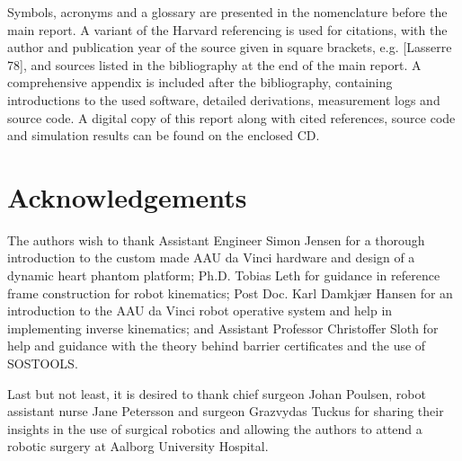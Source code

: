 Symbols, acronyms and a glossary are presented in the nomenclature before the main report.
A variant of the Harvard referencing is used for citations, with the author and publication year of the source given in square brackets, e.g. [Lasserre 78], and sources listed in the bibliography at the end of the main report. %
A comprehensive appendix is included after the bibliography, containing introductions to the used software, detailed derivations, measurement logs and source code.
A digital copy of this report along with cited references, source code and simulation results can be found on the enclosed CD.

\vspace*{-2mm}
\section*{Acknowledgements}
\vspace*{-2mm}
The authors wish to thank Assistant Engineer Simon Jensen for a thorough introduction to the custom made AAU da Vinci hardware and design of a dynamic heart phantom platform; Ph.D. Tobias Leth for guidance in reference frame construction for robot kinematics;  Post Doc. Karl Damkj\ae r Hansen for an introduction to the AAU da Vinci robot operative system and help in implementing inverse kinematics; and Assistant Professor Christoffer Sloth for help and guidance with the theory behind barrier certificates and the use of SOSTOOLS.

Last but not least, it is desired to thank chief surgeon Johan Poulsen, robot assistant nurse Jane Petersson and surgeon Grazvydas Tuckus for sharing their insights in the use of surgical robotics and allowing the authors to attend a robotic surgery at Aalborg University Hospital.


